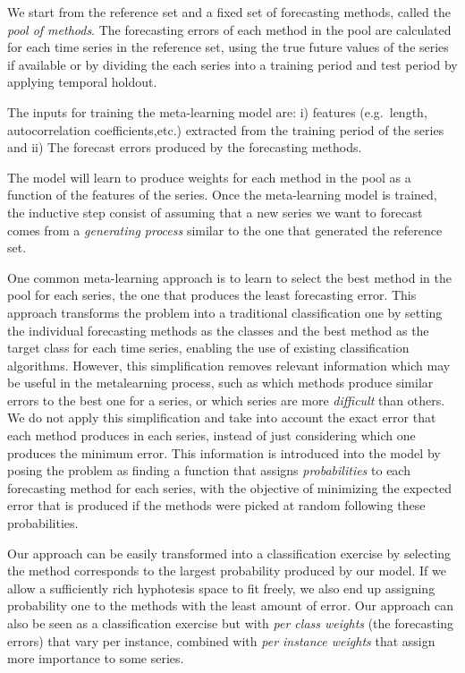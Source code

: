 \documentclass[11pt,a4paper,]{article}
\theoremstyle{definition}
\theoremstyle{definition}
\theoremstyle{definition}
\theoremstyle{remark}
\begin{document}
We start from the reference set and a fixed set of forecasting methods,
called the \emph{pool of methods}. The forecasting errors of each method
in the pool are calculated for each time series in the reference set,
using the true future values of the series if available or by dividing
the each series into a training period and test period by applying
temporal holdout.

The inputs for training the meta-learning model are: i) features
(e.g.~length, autocorrelation coefficients,etc.) extracted from the
training period of the series and ii) The forecast errors produced by
the forecasting methods.

The model will learn to produce weights for each method in the pool as a
function of the features of the series. Once the meta-learning model is
trained, the inductive step consist of assuming that a new series we
want to forecast comes from a \emph{generating process} similar to the
one that generated the reference set.

One common meta-learning approach is to learn to select the best method
in the pool for each series, the one that produces the least forecasting
error. This approach transforms the problem into a traditional
classification one by setting the individual forecasting methods as the
classes and the best method as the target class for each time series,
enabling the use of existing classification algorithms. However, this
simplification removes relevant information which may be useful in the
metalearning process, such as which methods produce similar errors to
the best one for a series, or which series are more \emph{difficult}
than others. We do not apply this simplification and take into account
the exact error that each method produces in each series, instead of
just considering which one produces the minimum error. This information
is introduced into the model by posing the problem as finding a function
that assigns \emph{probabilities} to each forecasting method for each
series, with the objective of minimizing the expected error that is
produced if the methods were picked at random following these
probabilities.

Our approach can be easily transformed into a classification exercise by
selecting the method corresponds to the largest probability produced by
our model. If we allow a sufficiently rich hyphotesis space to fit
freely, we also end up assigning probability one to the methods with the
least amount of error. Our approach can also be seen as a classification
exercise but with \emph{per class weights} (the forecasting errors) that
vary per instance, combined with \emph{per instance weights} that assign
more importance to some series.
\end{document}

